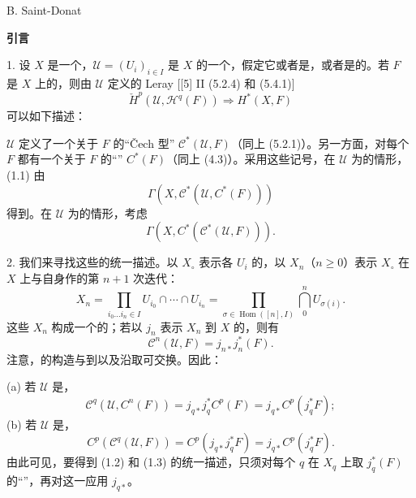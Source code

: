 \begin{center}B. Saint-Donat\end{center}
\textbf{引言}

1. 设 $X$ 是一个，$\mathcal U=(U_i)_{i\in I}$ 是 $X$ 的一个，假定它或者是，或者是的。若 $F$ 是 $X$ 上的，则由 $\mathcal U$ 定义的 Leray  [[5] II (5.2.4) 和 (5.4.1)]
\[
\check H^p(\mathcal U,\mathcal H^q(F))\Longrightarrow H^*(X,F) \tag{1.1}
\]
可以如下描述：

 $\mathcal U$ 定义了一个关于 $F$ 的“Čech 型” $\mathcal C^*(\mathcal U,F)$（同上 (5.2.1)）。另一方面，对每个 $F$ 都有一个关于 $F$ 的“” $C^*(F)$（同上 (4.3)）。采用这些记号，在 $\mathcal U$ 为的情形， (1.1) 由
\[
\Gamma(X,\mathcal C^*(\mathcal U,C^*(F))) \tag{1.2}
\]
得到。在 $\mathcal U$ 为的情形，考虑
\[
\Gamma(X,C^*(\mathcal C^*(\mathcal U,F))). \tag{1.3}
\]

2. 我们来寻找这些的统一描述。以 $X_\circ$ 表示各 $U_i$ 的，以 $X_n$（$n\geq0$）表示 $X_\circ$ 在 $X$ 上与自身作的第 $n+1$ 次迭代：
\[
X_n=\prod_{i_0\ldots i_n\in I} U_{i_0}\cap\cdots\cap U_{i_n}
=\prod_{\sigma\in\operatorname{Hom}([n],I)}\bigcap_0^n U_{\sigma(i)}. \tag{2.1}
\]
这些 $X_n$ 构成一个的；若以 $j_n$ 表示 $X_n$ 到 $X$ 的，则有
\[
\mathcal C^n(\mathcal U,F)=j_{n*}j_n^*(F). \tag{2.2}
\]
注意，的构造与到以及沿取可交换。因此：

(a) 若 $\mathcal U$ 是，
\[
\mathcal C^q(\mathcal U,C^n(F))=j_{q*}j_q^*C^p(F)=j_{q*}C^p(j_q^*F); \tag{2.3}
\]
(b) 若 $\mathcal U$ 是，
\[
C^p(\mathcal C^q(\mathcal U,F))=C^p(j_{q*}j_q^*F)=j_{q*}C^p(j_q^*F). \tag{2.4}
\]
由此可见，要得到 (1.2) 和 (1.3) 的统一描述，只须对每个 $q$ 在 $X_q$ 上取 $j_q^*(F)$ 的“”，再对这一应用 $j_{q*}$。

